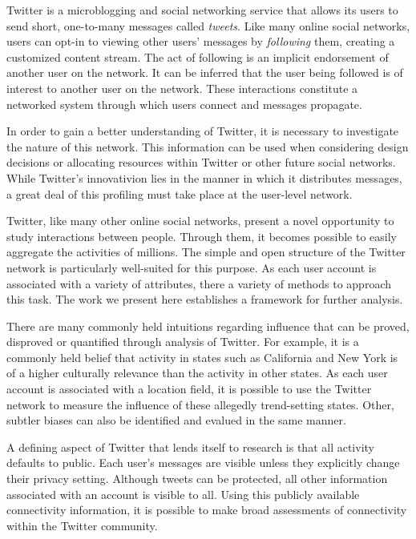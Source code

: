 Twitter is a microblogging and social networking service that allows its users to send short, one-to-many messages called \textit{tweets}.  Like many online social networks, users can opt-in to viewing other users' messages by \textit{following} them, creating a customized content stream.  The act of following is an implicit endorsement of another user on the network.  It can be inferred that the user being followed is of interest to another user on the network.  These interactions constitute a networked system through which users connect and messages propagate.

In order to gain a better understanding of Twitter, it is necessary to investigate the nature of this network.  This information can be used when considering design decisions or allocating resources within Twitter or other future social networks.  While Twitter's innovativion lies in the manner in which it distributes messages, a great deal of this profiling must take place at the user-level network.

Twitter, like many other online social networks, present a novel opportunity to study interactions between people.  Through them, it becomes possible to easily aggregate the activities of millions.  The simple and open structure of the Twitter network is particularly well-suited for this purpose.  As each user account is associated with a variety of attributes, there a variety of methods to approach this task.  The work we present here establishes a framework for further analysis.

There are many commonly held intuitions regarding influence that can be proved, disproved or quantified through analysis of Twitter.  For example, it is a commonly held belief that activity in states such as California and New York is of a higher culturally relevance than the activity in other states.  As each user account is associated with a location field, it is possible to use the Twitter network to measure the influence of these allegedly trend-setting states.  Other, subtler biases can also be identified and evalued in the same manner.

A defining aspect of Twitter that lends itself to research is that all activity defaults to public.  Each user's messages are visible unless they explicitly change their privacy setting.  Although tweets can be protected, all other information associated with an account is visible to all.  Using this publicly available connectivity information, it is possible to make broad assessments of connectivity within the Twitter community.

